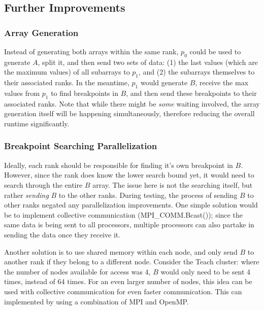 \documentclass[12pt]{article}
\begin{document}
{    \subsection{Further Improvements}
    \subsubsection{Array Generation}
    Instead of generating both arrays within the same rank, $p_0$ could be used to generate $A$, split it, and then send two sets of data: (1) the last values (which are the maximum values) of all subarrays to $p_1$, and (2) the subarrays themselves to their associated ranks. In the meantime, $p_1$ would generate $B$, receive the max values from $p_1$ to find breakpoints in $B$, and then send these breakpoints to their associated ranks. Note that while there might be \emph{some} waiting involved, the array generation itself will be happening simultaneously, therefore reducing the overall runtime significantly.

    \subsubsection{Breakpoint Searching Parallelization}
    Ideally, each rank should be responsible for finding it's own breakpoint in $B$. However, since the rank does know the lower search bound yet, it would need to search through the entire $B$ array. The issue here is not the searching itself, but rather \emph{sending} $B$ to the other ranks. During testing, the process of sending $B$ to other ranks negated any parallelization improvements. One simple solution would be to implement collective communication (MPI\_COMM.Bcast()); since the same data is being sent to all processors, multiple processors can also partake in sending the data once they receive it. 

    \noindent Another solution is to use shared memory within each node, and only send $B$ to another rank if they belong to a different node. Consider the Teach cluster: where the number of nodes available for access was 4, $B$ would only need to be sent 4 times, instead of 64 times. For an even larger number of nodes, this idea can be used with collective communication for even faster communication. This can implemented by using a combination of MPI and OpenMP.

}
\end{document}
